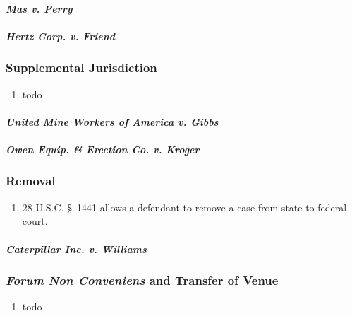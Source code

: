 \paragraph{\emph{Mas v. Perry}} %
\paragraph{\emph{Hertz Corp. v. Friend}} %

\subsubsection{Supplemental Jurisdiction}

\begin{enumerate}
    \item todo
\end{enumerate}

\paragraph{\emph{United Mine Workers of America v. Gibbs}} %
\paragraph{\emph{Owen Equip. \& Erection Co. v. Kroger}} %

\subsubsection{Removal}

\begin{enumerate}
    \item 28 U.S.C. \S\ 1441 allows a defendant to remove a case from state to federal court. %
\end{enumerate}

\paragraph{\emph{Caterpillar Inc. v. Williams}} %

\subsubsection{\emph{Forum Non Conveniens} and Transfer of Venue}

\begin{enumerate}
    \item todo
\end{enumerate}

